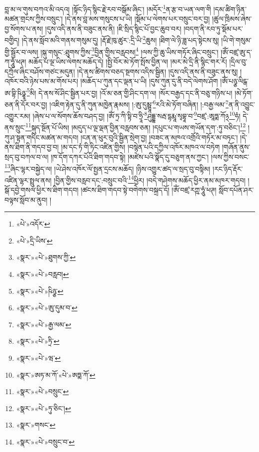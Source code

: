 བླ་མ་ལ་གུས་བཀའ་མི་འདའ། །སྟོང་ཉིད་སྙིང་རྗེ་རབ་བསྒོམ་ཞིང་། །མདོར་\footnote{«པེ་»འདོར་}ན་རྩ་བ་ཡན་ལག་གི །དམ་ཚིག་ཉིན་མཚན་གྲངས་ཀྱིས་བསྲུང་། །དེ་ནས་བླ་མས་གསུངས་པ་ཡི། །སྡོམ་པ་ལེགས་པར་བསྲུང་བར་བྱ། །ཚུལ་ཁྲིམས་ཞེས་བྱ་སོགས་པ་ནས། །དུས་འདི་ནས་ནི་བཟུང་ནས་ནི། །ཇི་སྲིད་སྙིང་པོ་བྱང་ཆུབ་བར། །བདག་ནི་རབ་ཏུ་སྡོམ་པར་བགྱིད། །དེ་ནས་སློབ་མའི་གནས་གསུམ་དུ། །རྡོ་རྗེ་ཁུ་ཚུར་:དྲི་ཡི་\footnote{«པེ་»དྲི་ཡིས་}ཆུས། །ཐིག་ལེ་ཉི་ཟླ་པད་སྟེངས་སུ། །ཡི་གེ་གསུམ་གྱི་སྦྱོར་བ་ལས། །སྐུ་གསུང་:ཐུགས་ཀྱིས་\footnote{«སྣར་»«པེ་»ཐུགས་ཀྱི་}བྱིན་གྱིས་བརླབས།\footnote{«སྣར་»«པེ་»བརླབ།} །ལས་ཀྱི་ཆུ་ཡིས་གཏོར་ཞིང་བསྲུང་། །ཨོཾ་བཛྲ་ཨུ་ད་ཀ་ཧཱུཾ་ཕཊ། མཆོད་པ་ལྔ་ཡིས་ལེགས་མཆོད་དེ། །སྤྱི་བོར་མེ་ཏོག་སྤོས་བྱིན་ལ། །མར་མེ་དྲི་ནི་སྙིང་གར་རོ། །དྲིལ་བུ་དཀྲོལ་ཞིང་བཤོས་གཙང་མདུན། །དེ་ནས་ཚིགས་བཅད་སྔགས་འདིས་སྦྱིན། །དུས་འདི་ནས་ནི་བཟུང་ནས་སུ། །འཁོར་བའི་ཉེས་པས་མ་གོས་པར། །མཆོད་པ་ཀུན་དང་ལྡན་པ་ཡི། །དུས་ཀུན་དུ་ནི་བདེ་ལེགས་ཤོག །ཨོཾ་པཉྩ་ལིངྒ་ཨ་བྷི་ཥིཉྩཱ་\footnote{«སྣར་»«པེ་»ཥིཉྩ་}མི། དེ་ནས་སོ་ཤིང་སྦྱིན་པར་བྱ། །འོ་མ་ཅན་གྱི་ཤིང་དག་ལ། །སོར་བརྒྱད་དང་ནི་བཅུ་གཉིས་པ། །མེ་ཏོག་ཅན་ནི་དོར་བར་བྱ། །འཇིག་རྟེན་དུ་ནི་ཀུན་མཁྱེན་རྣམས། །:ཨུ་དུམྺཱ་\footnote{«སྣར་»«པེ་»ཨུ་དུམ་བ་}རའི་མེ་ཏོག་བཞིན། །:བརྒྱ་ལམ་\footnote{«སྣར་»«པེ་»རྒྱ་ལམ་}ན་ནི་འབྱུང་འགྱུར་རམ། །ཞེས་པ་ལ་སོགས་ཆོས་བཤད་བྱ། །ཨོཾ་ཏྲ་ཀི་སྟི་བ་ཧྲཱི་\footnote{«སྣར་»«པེ་»ཏྲི་}ཤུདྡྷ་སརྦ་དྷརྨཱ་སྭབྷཱ་བ་\footnote{«སྣར་»«པེ་»ཝ་}བཛྲ་:ཨཱཏྨ་ཀོ྅\footnote{«སྣར་»ཨཏ་མ་ཀོ་«པེ་»ཨཏྨ་ཀོ་}ཧཾ། དེ་ནས་སྲུང་\footnote{«སྣར་»«པེ་»བསྲུང་}སྐུད་སྔོན་པོ་ཡིས། །མདུད་པ་ལྔ་ལྡན་བྱིན་བརླབས་ཅན། །དཔུང་པ་གཡས་གཡོན་དག་:ཏུ་བཅིང་།\footnote{«སྣར་»«པེ་»ཏུ་ཅིང་།} །ཀུ་ཤ་སྟན་གདིང་མཚན་མ་གདབ། །ངན་ན་ཕུར་བུའི་སྦྱིན་སྲེག་བྱ། །བཟང་ན་མཁའ་འགྲོའི་གཏོར་མ་བཏང་། །དེ་ནས་ཐིག་ནི་གདབ་བྱ་བ། །མ་དང་ཏཾ་གི་ཏིང་འཛིན་གྱིས། །བསྙེན་པའི་དཀྱིལ་འཁོར་མཁའ་ལ་བཏེག །གཞོན་ནུས་སྲད་བུ་བཀལ་བ་ལ། །ཁ་དོག་དཀར་པོའི་ཐིག་གདབ་སྟེ། །མཛེས་པའི་སྣོད་དུ་བཅུག་ནས་ཀྱང་། །ལས་ཀྱིས་བསང་\footnote{«སྣར་»གསང་}ཞིང་ལྷར་བསྐྱེད་ལ། །ཡེ་ཤེས་འཁོར་ལོ་སྤྱན་དྲངས་མཆོད། །ཉིས་འགྱུར་ཚད་ལ་སྲད་བུ་བསྟིམ། །རང་ཉིད་རྡོར་འཛིན་ལྷར་སྤྲུལ་ནས། །བྱིན་གྱིས་བརླབ་དང་:བསྲུང་བའི་\footnote{«སྣར་»«པེ་»བསྲུང་བ་}ཕྱིར། །བདེ་གཤེགས་མཆོད་ཕྱིར་ནམ་མཁར་གདབ། །སྒོ་དབྱེ་གསལ་ཕྱིར་ས་ཐིག་གདབ། །ཚངས་ཐིག་གདབ་སྟེ་བགེགས་བསྐྲད་དོ། །ཨོཾ་བཛྲ་རཀྵ་ཧཱུཾ་ཕཊ། སློབ་དཔོན་ཤར་བལྟས་སློབ་མ་ནུབ། །

